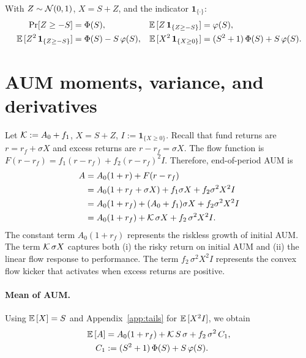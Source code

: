 \begin{lemma}
\label{lem:tails}
With $Z\sim\mathcal{N}(0,1)$, $X=S+Z$, and the indicator $\mathbf 1_{\{\cdot\}}$:
\begin{align*}
\Pr[Z\ge -S] &= \Phi(S), & {\mathbb{E}}\,[Z\,\mathbf 1_{\{Z\ge -S\}}] &= \varphi(S),\\
{\mathbb{E}}\,[Z^2\,\mathbf 1_{\{Z\ge -S\}}] &= \Phi(S) - S\,\varphi(S), & {\mathbb{E}}\,[X^2\,\mathbf 1_{\{X\ge 0\}}] &= (S^2+1)\,\Phi(S) + S\,\varphi(S).
\end{align*}
\end{lemma}

\section{AUM moments, variance, and derivatives}
\label{app:variance}
Let $\mathcal{K}:=A_0+f_1$, $X=S+Z$, $I:=\mathbf 1_{\{X\ge 0\}}$. Recall that fund returns are $r=r_f+\sigma X$ and excess returns are $r-r_f=\sigma X$. The flow function is $F(r-r_f)=f_1(r-r_f)+f_2(r-r_f)^2 I$. Therefore, end-of-period AUM is
\begin{align}
A &= A_0(1+r) + F(r-r_f) \nonumber\\
&= A_0(1+r_f+\sigma X) + f_1\sigma X + f_2\sigma^2 X^2 I \nonumber\\
&= A_0(1+r_f) + (A_0+f_1)\sigma X + f_2\sigma^2 X^2 I \nonumber\\
&= A_0(1+r_f) + \mathcal{K}\,\sigma X + f_2\,\sigma^2 X^2 I.
\end{align}
The constant term $A_0(1+r_f)$ represents the riskless growth of initial AUM. The term $\mathcal{K}\,\sigma X$ captures both (i) the risky return on initial AUM and (ii) the linear flow response to performance. The term $f_2\,\sigma^2 X^2 I$ represents the convex flow kicker that activates when excess returns are positive.

\paragraph{Mean of AUM.}
Using ${\mathbb{E}}\,[X]=S$ and Appendix~\ref{app:tails} for ${\mathbb{E}}\,[X^2 I]$, we obtain
\begin{align}
{\mathbb{E}}\,[A] &= A_0(1+r_f) + \mathcal{K}\,S\,\sigma + f_2\,\sigma^2\,C_1,\label{eq:EA-correct}\\
C_1 &:= (S^2+1)\,\Phi(S) + S\,\varphi(S).\label{eq:C1}
\end{align}

